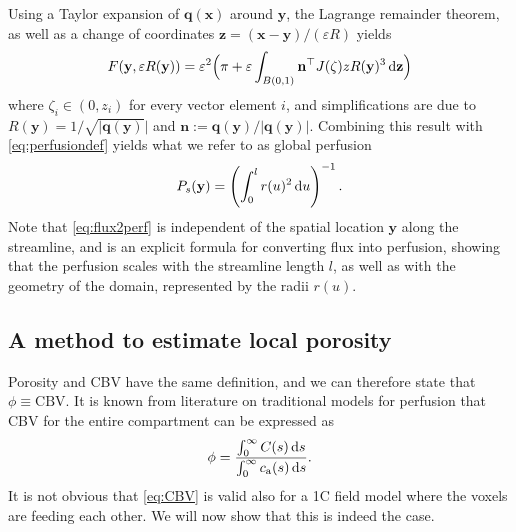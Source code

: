 \documentclass[aps,prb,article,groupedaddress,showkeys]{revtex4}
\begin{document}
	Using a Taylor expansion of $\mathbf{q}(\mathbf{x})$ around $\mathbf{y}$, the Lagrange remainder theorem, as well as a change of coordinates $\mathbf{z} = (\mathbf{x}-\mathbf{y})/(\varepsilon R)$ yields 
	\begin{equation}
		F(\mathbf{y},\varepsilon R(\mathbf{y}))
		= \varepsilon^2 \Big(\pi + \varepsilon \int_{B(0,1)} \mathbf{n}^\top J(\zeta)zR(\mathbf{y})^3 \,\mathrm{d} \mathbf{z} \Big)
	\end{equation}
	where $\zeta_i \in (0,z_i)$ for every vector element $i$, and simplifications are due to $R(\mathbf{y}) = 1/\sqrt{\vert \mathbf{q}(\mathbf{y})} \vert$ and $\mathbf{n}:=\mathbf{q}(\mathbf{y})/\vert \mathbf{q}(\mathbf{y}) \vert$.
	Combining this result with \eqref{eq:perfusiondef} yields what we refer to as global perfusion
	\begin{equation}\label{eq:flux2perf}
		P_s(\mathbf{y}) = \left(\int_0^l r(u)^2 \,\mathrm{d} u\right)^{-1}.
	\end{equation}
	Note that \eqref{eq:flux2perf} is independent of the spatial location $\mathbf{y}$ along the streamline, and is an explicit formula for converting flux into perfusion, showing that the perfusion scales with the streamline length $l$, as well as with the geometry of the domain, represented by the radii $r(u)$.


	\subsection{A method to estimate local porosity}\label{sec:CBV}

	Porosity and CBV have the same definition, and we can therefore state that $\phi \equiv \mathrm{CBV}$. It is known from literature on traditional models \cite{sourbron13} for perfusion that CBV for the entire compartment can be expressed as
	\begin{equation}
		\phi = \frac{\int_0^\infty C(s) \,\mathrm{d} s}{\int_0^\infty c_\mathrm{a}(s) \,\mathrm{d} s}.
		\label{eq:CBV}
	\end{equation}
	It is not obvious that \eqref{eq:CBV} is valid also for a 1C field model where the voxels are feeding each other. 
	We will now show that this is indeed the case.
	
\end{document}
